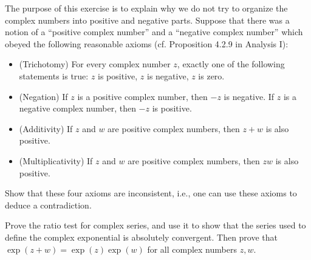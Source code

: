 \begin{exercise}\label{ex 4.6.15}
    The purpose of this exercise is to explain why we do not try to organize the complex numbers into positive and negative parts.
    Suppose that there was a notion of a ``positive complex number'' and a ``negative complex number'' which obeyed the following reasonable axioms (cf. Proposition 4.2.9 in Analysis I):
    \begin{itemize}
        \item (Trichotomy)
              For every complex number \(z\), exactly one of the following statements is true:
              \(z\) is positive, \(z\) is negative, \(z\) is zero.
        \item (Negation)
              If \(z\) is a positive complex number, then \(-z\) is negative.
              If \(z\) is a negative complex number, then \(-z\) is positive.
        \item (Additivity)
              If \(z\) and \(w\) are positive complex numbers, then \(z + w\) is also positive.
        \item (Multiplicativity)
              If \(z\) and \(w\) are positive complex numbers, then \(zw\) is also positive.
    \end{itemize}
    Show that these four axioms are inconsistent, i.e., one can use these axioms to deduce a contradiction.
\end{exercise}

\begin{exercise}\label{ex 4.6.16}
    Prove the ratio test for complex series, and use it to show that the series used to define the complex exponential is absolutely convergent.
    Then prove that \(\exp(z + w) = \exp(z) \exp(w)\) for all complex numbers \(z, w\).
\end{exercise}